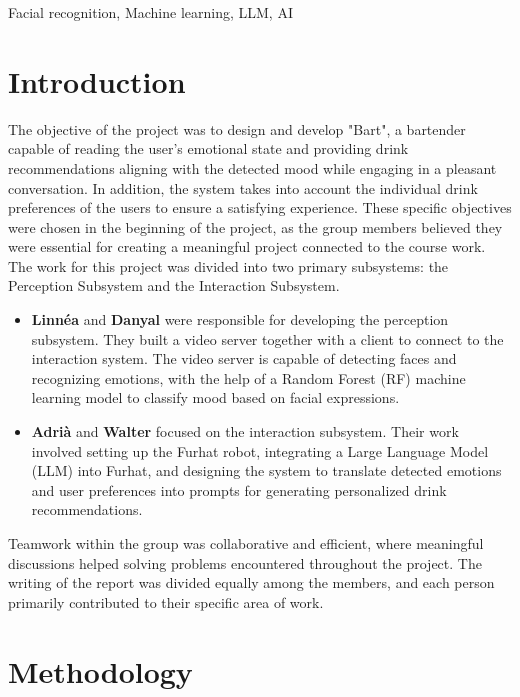 \documentclass[conference]{IEEEtran}
\begin{document}
\begin{IEEEkeywords}
Facial recognition, Machine learning, LLM, AI
\end{IEEEkeywords}

\section{Introduction}

The objective of the project was to design and develop "Bart", a bartender capable of reading the user's emotional state and providing drink recommendations aligning with the detected mood while engaging in a pleasant conversation. In addition, the system takes into account the individual drink preferences of the users to ensure a satisfying experience. These specific objectives were chosen in the beginning of the project, as the group members believed they were essential for creating a meaningful project connected to the course work. 
The work for this project was divided into two primary subsystems: the Perception Subsystem and the Interaction Subsystem. 

\begin{itemize}
    \item \textbf{Linnéa} and \textbf{Danyal} were responsible for developing the perception subsystem. They built a video server together with a client to connect to the interaction system. The video server is capable of detecting faces and recognizing emotions, with the help of a Random Forest (RF) machine learning model to classify mood based on facial expressions.
    
    
    \item \textbf{Adrià} and \textbf{Walter} focused on the interaction subsystem. Their work involved setting up the Furhat robot, integrating a Large Language Model (LLM) into Furhat, and designing the system to translate detected emotions and user preferences into prompts for generating personalized drink recommendations.

\end{itemize}

Teamwork within the group was collaborative and efficient, where meaningful discussions helped solving problems encountered throughout the project. The writing of the report was divided equally among the members, and each person primarily contributed to their specific area of work.
\\
\section{Methodology}
\end{document}

